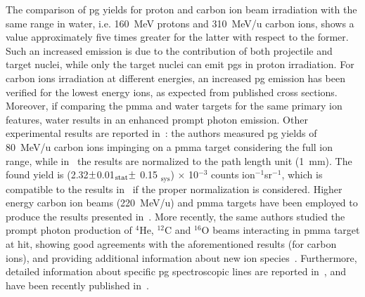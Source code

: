 The comparison of \gls{pg} yields for proton and carbon ion beam irradiation with the same range in water, i.e. 160~MeV protons and 310~MeV/u carbon ions, shows a value approximately five times greater for the latter with respect to the former. Such an increased emission is due to the contribution of both projectile and target nuclei, while only the target nuclei can emit \glspl{pg} in proton irradiation. For carbon ions irradiation at different energies, an increased \gls{pg} emission has been verified for the lowest energy ions, as expected from published cross sections. Moreover, if comparing the \gls{pmma} and water targets for the same primary ion features, water results in an enhanced prompt photon emission. 
Other experimental results are reported in~\cite{Agodi2012, Agodi2013}: the authors measured \gls{pg} yields of 80~MeV/u carbon ions impinging on a \gls{pmma} target considering the full ion range, while in~\cite{Pinto2015} the results are normalized to the path length unit (1~mm). The found yield is (2.32$\varpm$0.01$_{\mathrm{stat}} \varpm$ 0.15 $_{\mathrm{sys}}$) $\times$ 10$^{-3}$ counts ion$^{-1}$sr$^{-1}$, which is compatible to the results in~\cite{Pinto2015} if the proper normalization is considered. Higher energy carbon ion beams (220~MeV/u) and \gls{pmma} targets have been employed to produce the results presented in~\cite{Mattei2015}. More recently, the same authors studied the prompt photon production of $^{4}$He, $^{12}$C and $^{16}$O beams interacting in \gls{pmma} target at \gls{hit}, showing good agreements with the aforementioned results (for carbon ions), and providing additional information about new ion species~\parencite{Mattei2017}. 
Furthermore, detailed information about specific \gls{pg} spectroscopic lines are reported in~\cite{Verburg2014, Verburg2013}, and have been recently published in~\cite{Kelleter2017}.

